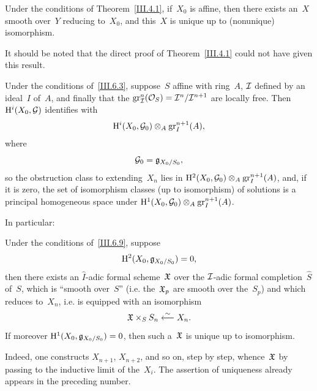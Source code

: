 \begin{corollary}
\label{III.6.8}
Under the conditions of Theorem~\ref{III.4.1}, if~$X_0$ is affine, then there exists an~$X$ smooth over~$Y$ reducing to~$X_0$, and this~$X$ is unique up to (nonunique) isomorphism.
\end{corollary}

It should be noted that the direct proof of Theorem~\ref{III.4.1} could not have given this result.

\begin{corollary}
\label{III.6.9}
Under the conditions of~\ref{III.6.3}, suppose~$S$ affine with ring~$A$, $\cal{I}$ defined by an ideal~$I$ of~$A$, and finally that the $\gr^n_{\cal{I}}(\cal{O}_S)=\cal{I}^n/\cal{I}^{n+1}$ are locally free. Then $\H^i(X_0,\cal{G})$ identifies with
$$
\H^i(X_0,\cal{G}_0)\otimes_A\gr^{n+1}_I(A),
$$
where
$$
\cal{G}_0=\goth{g}_{X_0/S_0},
$$
so the obstruction class to extending~$X_n$ lies in $\H^2(X_0,\cal{G}_0)\otimes_A\gr^{n+1}_I(A)$, and, if it is zero, the set of isomorphism classes (up to isomorphism) of solutions is a principal homogeneous space under
$\H^1(X_0,\cal{G}_0)\otimes_A\gr^{n+1}_I(A)$.
\end{corollary}

In particular:

\begin{corollary}
\label{III.6.10}
Under the conditions of~\ref{III.6.9}, suppose
$$
\H^2(X_0,\goth{g}_{X_0/S_0})=0,
$$
then there exists an $\hat{I}$-adic formal scheme~$\goth{X}$ over the $\cal{I}$-adic formal completion~$\hat{S}$ of~$S$, which is ``smooth over~$S$'' (i.e. the~$\goth{X}_p$ are smooth over the~$S_p$) and which reduces to~$X_n$, i.e. is equipped with an isomorphism
$$
\goth{X}\times_S S_n\isomfrom X_n.
$$
If moreover $\H^1(X_0,\goth{g}_{X_0/S_0})=0$, then such a~$\goth{X}$ is unique up to isomorphism.
\end{corollary}

Indeed, one constructs $X_{n+1}$, $X_{n+2}$, and so on, step by step, whence~$\goth{X}$ by passing to the inductive limit of the~$X_i$. The assertion of uniqueness already appears in the preceding number.
